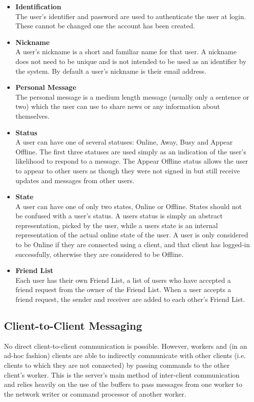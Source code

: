 \begin{itemize}
\item{{\bf Identification}\\
The user's identifier and password are used to authenticate the user at login. These cannot be changed one the account has been created.} 

\item{{\bf Nickname}\\
A user's nickname is a short and familiar name for that user. A nickname does not need to be unique and is not intended to be used as an identifier by the system. By default a user's nickname is their email address.}

\item{{\bf Personal Message}\\
The personal message is a medium length message (usually only a sentence or two) which the user can use to share news or any information about themselves.}

\item{{\bf Status}\\
A user can have one of several statuses: Online, Away, Busy and Appear Offline. The first three statuses are used simply as an indication of the user's likelihood to respond to a message. The Appear Offline status allows the user to appear to other users as though they were not signed in but still receive updates and messages from other users.}

\item{{\bf State}\\
A user can have one of only two states, Online or Offline. States should not be confused with a user's status. A users status is simply an abstract representation, picked by the user, while a users state is an internal representation of the actual online state of the user. A user is only considered to be Online if they are connected using a client, and that client has logged-in successfully, otherwise they are considered to be Offline.}

\item{{\bf Friend List}\\
Each user has their own Friend List, a list of users who have accepted a friend request from the owner of the Friend List. When a user accepts a friend request, the sender and receiver are added to each other's Friend List.}
\end{itemize}



\subsection{Client-to-Client Messaging}
\label{c2c}
No direct client-to-client communication is possible. However, workers and (in an ad-hoc fashion) clients are able to indirectly communicate with other clients (i.e. clients to which they are not connected) by passing commands to the other client's worker. This is the server's main method of inter-client communication and relies heavily on the use of the buffers to pass messages from one worker to the network writer or command processor of another worker.

